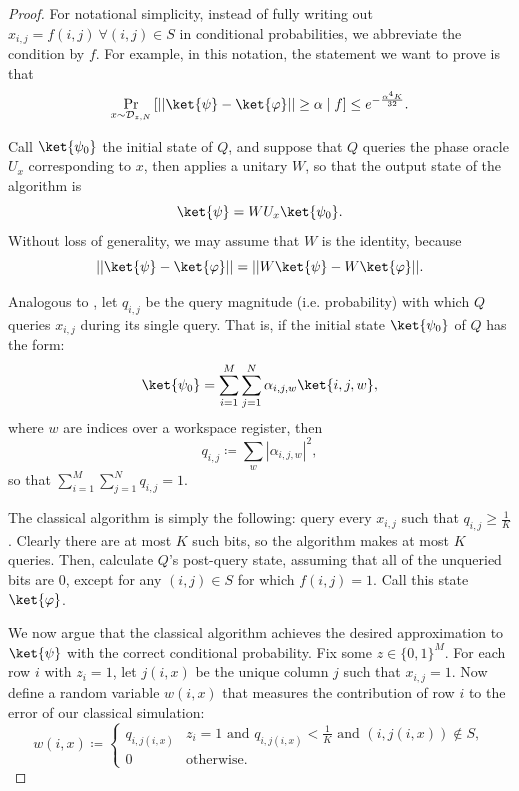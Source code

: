 \documentclass[11pt]{article}%
\begin{document}
\begin{proof}
For notational simplicity, instead of fully writing out $x_{i,j} = f(i, j)\ \forall (i, j) \in S$ in conditional probabilities, we abbreviate the condition by $f$. For example, in this notation, the statement we want to prove is that
\[
\Pr_{x \sim \mathcal{D}_{z,N}} \left[|| \ket{\psi} - \ket{\varphi}|| \ge \alpha \mid f\right] \le e^{-\frac{\alpha^4 K}{32}}.
\]

Call $\ket{\psi_0}$ the initial state of $Q$, and suppose that $Q$ queries the phase oracle $U_x$ corresponding to $x$, then applies a unitary $W$, so that the output state of the algorithm is
\[
\ket{\psi} = W U_x \ket{\psi_0}.
\]
Without loss of generality, we may assume that $W$ is the identity, because
\[
|| \ket{\psi} - \ket{\varphi}|| = || W\ket{\psi} - W\ket{\varphi}||.
\]

Analogous to , let $q_{i,j}$ be the query magnitude (i.e. probability) with which $Q$ queries $x_{i,j}$ during its single query. That is, if the initial state $\ket{\psi_0}$ of $Q$ has the form:
\[
\ket{\psi_0} = \sum_{i=1}^M \sum_{j=1}^N \alpha_{i,j,w} \ket{i,j,w},
\]
where $w$ are indices over a workspace register, then
\[
q_{i,j} \coloneqq \sum_w |\alpha_{i,j,w}|^2,
\]
so that $\sum_{i=1}^M \sum_{j=1}^N q_{i,j} = 1$.

The classical algorithm is simply the following: query every $x_{i,j}$ such that $q_{i,j} \ge \frac{1}{K}$. Clearly there are at most $K$ such bits, so the algorithm makes at most $K$ queries. Then, calculate $Q$'s post-query state, assuming that all of the unqueried bits are $0$, except for any $(i, j) \in S$ for which $f(i, j) = 1$. Call this state $\ket{\varphi}$.

We now argue that the classical algorithm achieves the desired approximation to $\ket{\psi}$ with the correct conditional probability. Fix some $z \in \{0,1\}^M$. For each row $i$ with $z_i = 1$, let $j(i, x)$ be the unique column $j$ such that $x_{i,j} = 1$. Now define a random variable $w(i,x)$ that measures the contribution of row $i$ to the error of our classical simulation:
\begin{equation}
\label{eq:wij_def_2}
w(i,x) \coloneqq \begin{cases}
q_{i,j(i,x)} & z_i = 1 \text{ and } q_{i,j(i,x)} < \frac{1}{K} \text{ and } (i, j(i, x)) \not \in S,\\
0 & \text{otherwise}.
\end{cases}
\end{equation}


\end{proof}
\end{document}
